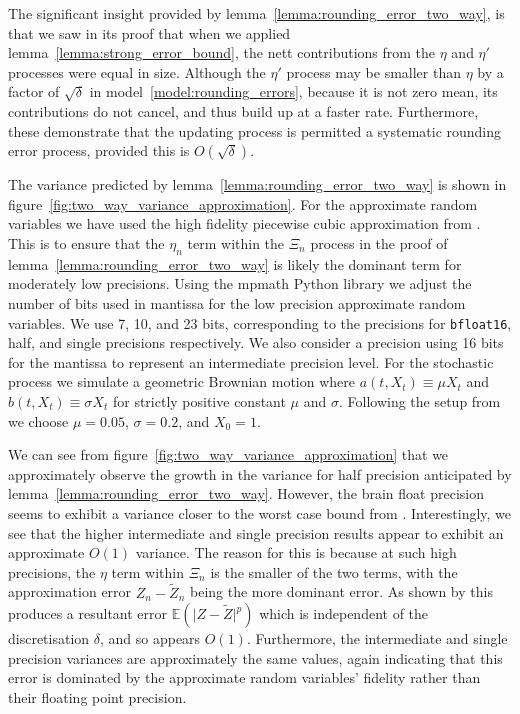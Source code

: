 \documentclass[manuscript,review]{acmart}
\begin{document}
The significant insight provided by lemma~\ref{lemma:rounding_error_two_way}, is that we saw in its proof that when we applied lemma~\ref{lemma:strong_error_bound}, the nett contributions from the $ \eta $ and $ \eta' $ processes were equal in size. Although the $ \eta' $ process may be smaller than $ \eta $ by a factor of $ \sqrt{\delta} $ in model~\ref{model:rounding_errors}, because it is not zero mean, its contributions do not cancel, and thus build up at a faster rate. Furthermore, these demonstrate that the updating process is permitted a systematic rounding error process, provided this is $ O(\sqrt{\delta}) $.

The variance predicted by lemma~\ref{lemma:rounding_error_two_way} is shown in figure~\ref{fig:two_way_variance_approximation}. For the approximate random variables we have used the high fidelity piecewise cubic approximation from \citet{giles2020approximating}. This is to ensure that the $ \eta_n $ term within the $ \Xi_n $ process in the proof of lemma~\ref{lemma:rounding_error_two_way} is likely the dominant term for moderately low precisions. Using the mpmath Python library we adjust the number of bits used in mantissa for the low precision approximate random variables. We use 7, 10, and 23 bits, corresponding to the precisions for \texttt{bfloat16}, half, and single precisions respectively. We also consider a precision using 16 bits for the mantissa to represent an intermediate precision level. For the stochastic process we simulate a geometric Brownian motion where $ a(t, X_t) \equiv \mu X_t $ and $ b(t, X_t) \equiv \sigma X_t $ for strictly positive constant $ \mu $ and $ \sigma $. Following the setup from \citet{giles2008multilevel} we choose $ \mu = 0.05 $, $ \sigma = 0.2 $, and $ X_0 = 1 $.

We can see from figure~\ref{fig:two_way_variance_approximation} that we approximately observe the growth in the variance for half precision anticipated by lemma~\ref{lemma:rounding_error_two_way}. However, the brain float precision seems to exhibit a variance closer to the worst case bound from \citet{omland2016mixed}. Interestingly, we see that the higher intermediate and single precision results appear to exhibit an approximate $ O(1) $ variance. The reason for this is because at such high precisions, the $ \eta $ term within $ \Xi_n $ is the smaller of the two terms, with the approximation error $ Z_n - \widetilde{Z}_n $ being the more dominant error. As shown by \citet{giles2020approximate} this produces a resultant error $ \mathbb{E}(\lvert Z - \widetilde{Z}\rvert^p) $ which is independent of the discretisation $ \delta $, and so appears $ O(1) $. Furthermore, the intermediate and single precision variances are approximately the same values, again indicating that this error is dominated by the approximate random variables' fidelity rather than their floating point precision. 
\end{document}
